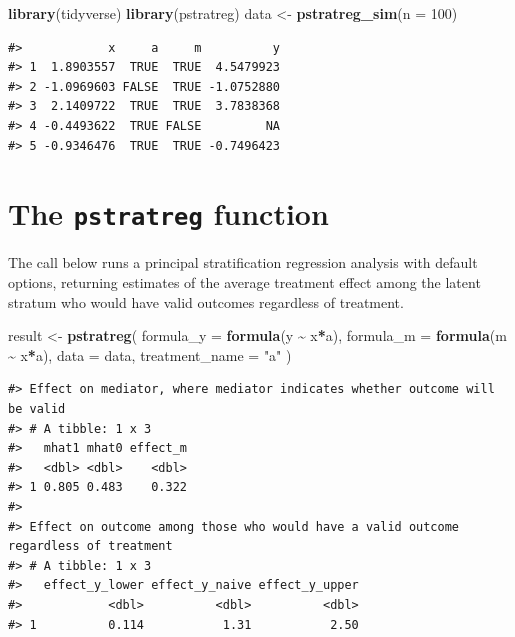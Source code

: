 \documentclass[
]{book}
\newenvironment{Shaded}{\begin{snugshade}}{\end{snugshade}}
\newcommand{\AttributeTok}[1]{\textcolor[rgb]{0.13,0.29,0.53}{#1}}
\newcommand{\DecValTok}[1]{\textcolor[rgb]{0.00,0.00,0.81}{#1}}
\newcommand{\FunctionTok}[1]{\textcolor[rgb]{0.13,0.29,0.53}{\textbf{#1}}}
\newcommand{\NormalTok}[1]{#1}
\newcommand{\OtherTok}[1]{\textcolor[rgb]{0.56,0.35,0.01}{#1}}
\newcommand{\SpecialCharTok}[1]{\textcolor[rgb]{0.81,0.36,0.00}{\textbf{#1}}}
\newcommand{\StringTok}[1]{\textcolor[rgb]{0.31,0.60,0.02}{#1}}
\begin{document}
\begin{Shaded}
\begin{Highlighting}[]
\FunctionTok{library}\NormalTok{(tidyverse)}
\FunctionTok{library}\NormalTok{(pstratreg)}
\NormalTok{data }\OtherTok{\textless{}{-}} \FunctionTok{pstratreg\_sim}\NormalTok{(}\AttributeTok{n =} \DecValTok{100}\NormalTok{)}
\end{Highlighting}
\end{Shaded}

\begin{verbatim}
#>            x     a     m          y
#> 1  1.8903557  TRUE  TRUE  4.5479923
#> 2 -1.0969603 FALSE  TRUE -1.0752880
#> 3  2.1409722  TRUE  TRUE  3.7838368
#> 4 -0.4493622  TRUE FALSE         NA
#> 5 -0.9346476  TRUE  TRUE -0.7496423
\end{verbatim}

\hypertarget{the-pstratreg-function}{%
\section{\texorpdfstring{The \texttt{pstratreg} function}{The pstratreg function}}\label{the-pstratreg-function}}

The call below runs a principal stratification regression analysis with default options, returning estimates of the average treatment effect among the latent stratum who would have valid outcomes regardless of treatment.

\begin{Shaded}
\begin{Highlighting}[]
\NormalTok{result }\OtherTok{\textless{}{-}} \FunctionTok{pstratreg}\NormalTok{(}
  \AttributeTok{formula\_y =} \FunctionTok{formula}\NormalTok{(y }\SpecialCharTok{\textasciitilde{}}\NormalTok{ x}\SpecialCharTok{*}\NormalTok{a),}
  \AttributeTok{formula\_m =} \FunctionTok{formula}\NormalTok{(m }\SpecialCharTok{\textasciitilde{}}\NormalTok{ x}\SpecialCharTok{*}\NormalTok{a),}
  \AttributeTok{data =}\NormalTok{ data,}
  \AttributeTok{treatment\_name =} \StringTok{"a"}
\NormalTok{)}
\end{Highlighting}
\end{Shaded}

\begin{verbatim}
#> Effect on mediator, where mediator indicates whether outcome will be valid
#> # A tibble: 1 x 3
#>   mhat1 mhat0 effect_m
#>   <dbl> <dbl>    <dbl>
#> 1 0.805 0.483    0.322
#> 
#> Effect on outcome among those who would have a valid outcome regardless of treatment
#> # A tibble: 1 x 3
#>   effect_y_lower effect_y_naive effect_y_upper
#>            <dbl>          <dbl>          <dbl>
#> 1          0.114           1.31           2.50
\end{verbatim}
\end{document}
